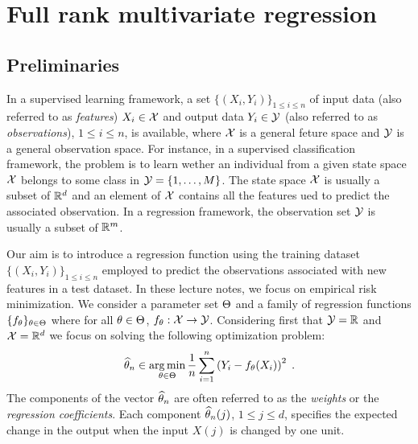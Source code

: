 
\section{Full rank multivariate regression}
\label{sec:full:rank:reg}

\subsection{Preliminaries}
In a supervised learning framework, a set $\{(X_i,Y_i)\}_{1\leqslant i \leqslant n}$  of input data (also referred to as {\em features}) $X_i\in\mathcal{X}$ and output data $Y_i\in\mathcal{Y}$ (also referred to as {\em observations}), $1\leqslant i \leqslant n$, is available, where $\mathcal{X}$ is a general feture space and $\mathcal{Y}$ is a general observation space. For instance, in a supervised classification framework, the problem is to learn wether an individual from a given state space $\mathcal{X}$ belongs to some class in $\mathcal{Y} = \{1,\ldots,M\}$. The state space $\mathcal{X}$ is usually a subset of $\mathbb{R}^d$ and an element of $\mathcal{X}$ contains all the features ued to predict the associated observation. In a regression framework, the observation set $\mathcal{Y}$ is usually a subset of $\mathbb{R}^m$.


Our aim is to introduce a regression function using the training dataset $\{(X_i,Y_i)\}_{1\leqslant i \leqslant n}$ employed to predict the observations associated with new features in a test dataset. In these lecture notes, we focus on empirical risk minimization. We consider a parameter set $\Theta$ and a family of regression functions $\{f_\theta\}_{\theta\in\Theta}$ where for all $\theta\in\Theta$, $f_\theta: \mathcal{X}\to \mathcal{Y}$. Considering first that $\mathcal{Y} = \mathbb{R}$ and  $\mathcal{X} = \mathbb{R}^d$  we focus on solving the following optimization problem:
$$
\widehat \param_n\in  \argmin_{\param\in\paramset}  \frac{1}{n}\sum_{i=1}^n\left(Y_i-f_\param(X_i)\right)^2\eqsp.
$$
The components of the vector $\widehat {\theta}_n$ are often referred to as the {\em weights} or the {\em regression coefficients}. Each component $\widehat {\theta}_n(j)$, $1\leqslant j \leqslant d$, specifies the expected change in the output when the input $X(j)$ is changed by one unit.

